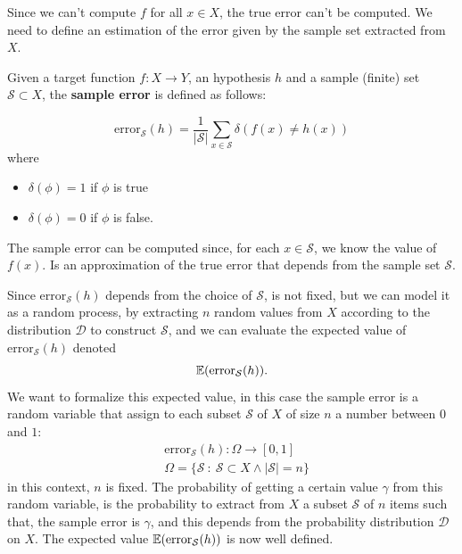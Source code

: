 \documentclass[10pt, letterpaper]{report}
\begin{document}
Since we can't compute $f$ for all $x\in X$, the true error can't be computed. We need to define an estimation of the error given by the sample set extracted from $X$.
\begin{definition}
    Given a target function $f:X\rightarrow Y$, an hypothesis $h$ and a sample (finite) set $\mathcal S\subset X$, the  \textbf{sample error} is defined as follows:
\end{definition}\begin{equation}
        \text{error}_{\mathcal S}(h)=
        \frac{1}{|\mathcal S|}\sum_{x\in\mathcal S}\delta(f(x)\ne h(x))
\end{equation}
where\begin{itemize}
    \item $\delta(\phi)=1$ if $\phi$ is true
    \item $\delta(\phi)=0$ if $\phi$ is false.
\end{itemize}
The sample error can be computed since, for each $x\in\mathcal S$, we know the value of $f(x)$. Is an approximation of the true error that depends from the sample set $\mathcal S$.\bigskip

Since $\text{error}_{\mathcal S}(h)$ depends from the choice of $\mathcal S$, is not fixed, but we can model it as a random process, by extracting $n$ random values from $X$ according to the distribution $\mathcal D$ to construct $\mathcal S$, and we can evaluate the expected value of $\text{error}_{\mathcal S}(h)$ denoted \begin{equation}
    {\mathbb E}(\text{error}_{\mathcal S}(h)).
\end{equation}
We want to formalize this expected value, in this case the sample error is a random variable that assign to each subset $\mathcal S$ of $X$ of size $n$ a number between 0 and $1$:
\begin{align}
    &\text{error}_{\mathcal S}(h) : \Omega \rightarrow [0,1]\\
    &\Omega =\{\mathcal S \ : \ \mathcal S \subset X \land |\mathcal S|=n\}
\end{align}
in this context, $n$ is fixed. The probability of getting a certain value $\gamma$ from this random variable, is the probability to extract from $X$ a subset $\mathcal S$ of $n$ items such that, the sample error is $\gamma$, and this depends from the probability distribution $\mathcal D$ on $X$. The expected value ${\mathbb E}(\text{error}_{\mathcal S}(h))$ is now well defined.
\end{document}
